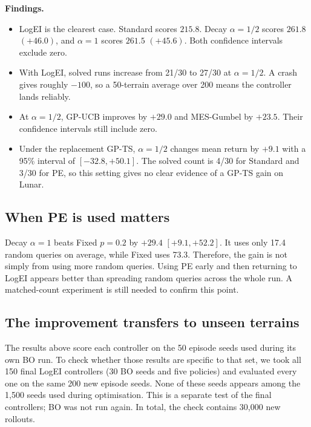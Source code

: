 \documentclass[11pt]{article}
\newcommand{\findings}{\textbf{Findings.}}
\begin{document}
\findings
\begin{itemize}
  \item LogEI is the clearest case. Standard scores $215.8$. Decay
        $\alpha=1/2$ scores $261.8$ $(+46.0)$, and $\alpha=1$ scores $261.5$
        $(+45.6)$. Both confidence intervals exclude zero.
  \item With LogEI, solved runs increase from 21/30 to 27/30 at
        $\alpha=1/2$. A crash gives roughly $-100$, so a 50-terrain average over
        200 means the controller lands reliably.
  \item At $\alpha=1/2$, GP-UCB improves by $+29.0$ and MES-Gumbel by $+23.5$.
        Their confidence intervals still include zero.
  \item Under the replacement GP-TS, $\alpha=1/2$ changes mean return by
        $+9.1$ with a 95\% interval of $[-32.8,+50.1]$. The solved count is
        4/30 for Standard and 3/30 for PE, so this setting gives no clear
        evidence of a GP-TS gain on Lunar.
\end{itemize}

\subsection{When PE is used matters}

\begin{table}[H]
\centering
\small

\caption{Decay schedules compared directly with Fixed $p=0.2$ under LogEI.}
\label{tab:lunarschedule}
\end{table}

Decay $\alpha=1$ beats Fixed $p=0.2$ by $+29.4$ $[+9.1,+52.2]$. It uses only
17.4 random queries on average, while Fixed uses 73.3. Therefore, the gain is not
simply from using more random queries. Using PE early and then returning to
LogEI appears better than spreading random queries across the whole run. A
matched-count experiment is still needed to confirm this point.

\subsection{The improvement transfers to unseen terrains}

The results above score each controller on the 50 episode seeds used during its
own BO run. To check whether those results are specific to that set, we took all
150 final LogEI controllers (30 BO seeds and five policies) and evaluated every
one on the same 200 new episode seeds. None of these seeds appears among the
1{,}500 seeds used during optimisation. This is a separate test of the final
controllers; BO was not run again. In total, the check contains 30{,}000 new
rollouts.
\end{document}
